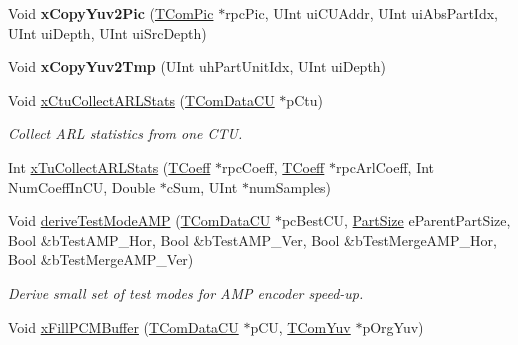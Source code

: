 \begin{DoxyCompactItemize}
\item 
\mbox{\label{class_t_enc_cu_aa20cad3d1ebba8ca1e86f1abfe50fcb4}} 
Void {\bfseries x\+Copy\+Yuv2\+Pic} (\hyperlink{class_t_com_pic}{T\+Com\+Pic} $\ast$rpc\+Pic, U\+Int ui\+C\+U\+Addr, U\+Int ui\+Abs\+Part\+Idx, U\+Int ui\+Depth, U\+Int ui\+Src\+Depth)
\item 
\mbox{\label{class_t_enc_cu_a6ec4976b783fd590d423ac8fc573e079}} 
Void {\bfseries x\+Copy\+Yuv2\+Tmp} (U\+Int uh\+Part\+Unit\+Idx, U\+Int ui\+Depth)
\item 
\mbox{\label{class_t_enc_cu_ab96cf885805c0e4a875d54f63284af3b}} 
Void \hyperlink{class_t_enc_cu_ab96cf885805c0e4a875d54f63284af3b}{x\+Ctu\+Collect\+A\+R\+L\+Stats} (\hyperlink{class_t_com_data_c_u}{T\+Com\+Data\+CU} $\ast$p\+Ctu)
\begin{DoxyCompactList}\small\item\em Collect A\+RL statistics from one C\+TU. \end{DoxyCompactList}\item 
Int \hyperlink{class_t_enc_cu_aa933e8f45f81ccb032e7392314db8cfa}{x\+Tu\+Collect\+A\+R\+L\+Stats} (\hyperlink{_type_def_8h_a5bdd3b17d14ed1978c366d2d958c0300}{T\+Coeff} $\ast$rpc\+Coeff, \hyperlink{_type_def_8h_a5bdd3b17d14ed1978c366d2d958c0300}{T\+Coeff} $\ast$rpc\+Arl\+Coeff, Int Num\+Coeff\+In\+CU, Double $\ast$c\+Sum, U\+Int $\ast$num\+Samples)
\item 
Void \hyperlink{class_t_enc_cu_a4f4641bb9daf4a3840fa3fd09af3f134}{derive\+Test\+Mode\+A\+MP} (\hyperlink{class_t_com_data_c_u}{T\+Com\+Data\+CU} $\ast$pc\+Best\+CU, \hyperlink{_type_def_8h_a0093b7809f3cfae06fda9d67441267bd}{Part\+Size} e\+Parent\+Part\+Size, Bool \&b\+Test\+A\+M\+P\+\_\+\+Hor, Bool \&b\+Test\+A\+M\+P\+\_\+\+Ver, Bool \&b\+Test\+Merge\+A\+M\+P\+\_\+\+Hor, Bool \&b\+Test\+Merge\+A\+M\+P\+\_\+\+Ver)
\begin{DoxyCompactList}\small\item\em Derive small set of test modes for A\+MP encoder speed-\/up. \end{DoxyCompactList}\item 
Void \hyperlink{class_t_enc_cu_a8b262f2311a38637923e57ca3b359484}{x\+Fill\+P\+C\+M\+Buffer} (\hyperlink{class_t_com_data_c_u}{T\+Com\+Data\+CU} $\ast$p\+CU, \hyperlink{class_t_com_yuv}{T\+Com\+Yuv} $\ast$p\+Org\+Yuv)
\end{DoxyCompactItemize}


